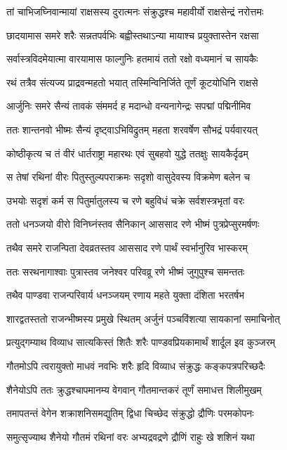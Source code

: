 \twolineshloka
{तां चाभिजघ्निवान्मायां राक्षसस्य दुरात्मनः}
{संक्रुद्धश्च महावीर्यो राक्षसेन्द्रं नरोत्तमः}


\twolineshloka
{छादयामास समरे शरैः सन्नतपर्वभिः}
{बह्वीस्तथाऽन्या मायाश्च प्रयुक्तास्तेन रक्षसा}


\twolineshloka
{सर्वास्त्रविदमेयात्मा वारयामास फाल्गुनिः}
{हतमायं ततो रक्षो वध्यमानं च सायकैः}


\twolineshloka
{रथं तत्रैव संत्यज्य प्राद्रवन्महतो भयात्}
{तस्मिन्विनिर्जिते तूर्णं कूटयोधिनि राक्षसे}


\twolineshloka
{आर्जुनिः समरे सैन्यं तावकं संममर्द ह}
{मदान्धो वन्यनागेन्द्रः सपद्मां पद्मिनीमिव}


\twolineshloka
{ततः शान्तनवो भीष्मः सैन्यं दृष्ट्वाऽभिविद्रुतम्}
{महता शरवर्षेण सौभद्रं पर्यवारयत्}


\twolineshloka
{कोष्ठीकृत्य च तं वीरं धार्तराष्ट्रा महारथः}
{एवं सुबहवो युद्धे ततक्षुः सायकैर्दृढम्}


\twolineshloka
{स तेषां रथिनां वीरः पितुस्तुल्यपराक्रमः}
{सदृशो वासुदेवस्य विक्रमेण बलेन च}


\twolineshloka
{उभयोः सदृशं कर्म स पितुर्मातुलस्य च}
{रणे बहुविधं चक्रे सर्वशस्त्रभृतां वरः}


\twolineshloka
{ततो धनञ्जयो वीरो विनिघ्नंस्तव सैनिकान्}
{आससाद रणे भीष्मं पुत्रप्रेप्सुरमर्षणः}


\twolineshloka
{तथैव समरे राजन्पिता देवव्रतस्तव}
{आससाद रणे पार्थं स्वर्भानुरिव भास्करम्}


\twolineshloka
{ततः सरथनागाश्वाः पुत्रास्तव जनेश्वर}
{परिवव्रू रणे भीष्मं जुगुपुश्च समन्ततः}


\twolineshloka
{तथैव पाण्डवा राजन्परिवार्य धनञ्जयम्}
{रणाय महते युक्ता दंशिता भरतर्षभ}


\twolineshloka
{शारद्वतस्ततो राजन्भीष्मस्य प्रमुखे स्थितम्}
{अर्जुनं पञ्चविंशत्या सायकानां समाचिनोत्}


\twolineshloka
{प्रत्युद्गम्याथ विव्याध सात्यकिस्तं शितैः शरैः}
{पाण्डवप्रियकामार्थं शार्दूल इव कुञ्जरम्}


\twolineshloka
{गौतमोऽपि त्वरायुक्तो माधवं नवभिः शरैः}
{हृदि विव्याध संक्रुद्धः कङ्कपत्रपरिच्छदैः}


\twolineshloka
{शैनेयोऽपि ततः क्रुद्धश्चापमानम्य वेगवान्}
{गौतमान्तकरं तूर्णं समाधत्त शिलीमुखम्}


\twolineshloka
{तमापतन्तं वेगेन शक्राशनिसमद्युतिम्}
{द्विधा चिच्छेद संक्रुद्धो द्रौणिः परमकोपनः}


\twolineshloka
{समुत्सृज्याथ शैनेयो गौतमं रथिनां वरः}
{अभ्यद्रवद्रणे द्रौणिं राहुः खे शशिनं यथा}


